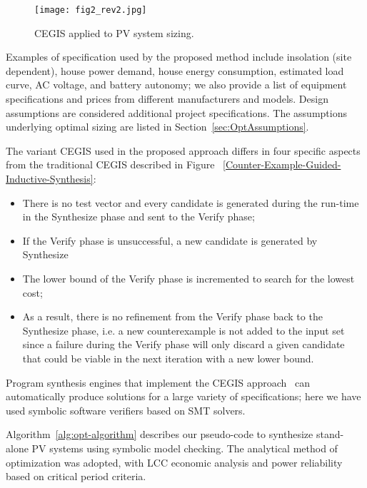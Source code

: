 \begin{figure}[h]
	\centering
	\texttt{[image: fig2\_rev2.jpg]}
	\caption{CEGIS applied to PV system sizing.}
	\label{CEGISalt}
\end{figure}

Examples of specification used by the proposed method include insolation (site dependent), house power demand, house  energy consumption, estimated load curve, AC voltage, and battery autonomy; we also provide a list of equipment specifications and prices from different manufacturers and models. Design assumptions are considered additional project specifications. The assumptions underlying optimal sizing are listed in Section~\ref{sec:OptAssumptions}.

The variant CEGIS used in the proposed approach differs in four specific aspects from the traditional CEGIS described in Figure ~\ref{Counter-Example-Guided-Inductive-Synthesis}: 

\begin{itemize}
\item There is no test vector and every candidate is generated during the run-time in the {\sc Synthesize} phase and sent to the {\sc Verify} phase; 
\item If the {\sc Verify} phase is unsuccessful, a new candidate is generated by {\sc Synthesize} 
\item The lower bound of the {\sc Verify} phase is incremented to search for the lowest cost; 
\item As a result, there is no refinement from the {\sc Verify} phase back to the {\sc Synthesize} phase, i.e. a new counterexample is not added to the {\sc input} set since a failure during the {\sc Verify} phase will only discard a given candidate that could be viable in the next iteration with a new lower bound.
\end{itemize}

Program synthesis engines that implement the CEGIS approach~\cite{sketch} can automatically produce solutions for a large variety of specifications; here we have used symbolic software verifiers based on SMT solvers.

Algorithm~\ref{alg:opt-algorithm} describes our pseudo-code to synthesize stand-alone PV systems using symbolic model checking. The analytical method of optimization was adopted, with LCC economic analysis and power reliability based on critical period criteria.

